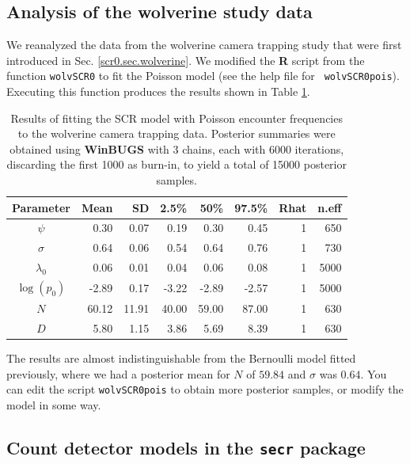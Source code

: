 

\subsection{Analysis of the wolverine study data}

We reanalyzed the data from the wolverine camera trapping study that
were first introduced in Sec. \ref{scr0.sec.wolverine}.  We modified
the {\bf R} script from the function \mbox{\tt wolvSCR0} to fit the
Poisson model (see the help file for \mbox{\tt
  wolvSCR0pois}). Executing this function produces the results shown
in Table \ref{poisson-mn.tab.wolverine}.
\begin{table}
\centering
\caption{Results of fitting the SCR model with Poisson encounter
  frequencies to the wolverine camera trapping data.
Posterior summaries were obtained using {\bf WinBUGS} with
 3 chains, each with 6000 iterations, discarding the first 1000 as
 burn-in, to yield a total of 15000 posterior samples.
}
\begin{tabular}{crrrrrrr} \hline \hline
 Parameter & Mean &  SD & 2.5\% & 50\%  & 97.5\% &Rhat& n.eff \\ \hline
$\psi$     &  0.30& 0.07& 0.19 &  0.30 & 0.45& 1 &  650 \\
$\sigma$   &  0.64& 0.06& 0.54 &  0.64 & 0.76& 1 &  730 \\
$\lambda_{0}$& 0.06& 0.01& 0.04 &  0.06 & 0.08& 1&  5000\\
$\log(p_0)$  &-2.89& 0.17& -3.22& -2.89& -2.57& 1&  5000\\
$N$        & 60.12&11.91& 40.00& 59.00& 87.00& 1&   630\\
$D$        &  5.80& 1.15& 3.86 & 5.69 & 8.39 & 1&   630\\ \hline
\end{tabular}
\label{poisson-mn.tab.wolverine}
\end{table}
The results are almost indistinguishable from the Bernoulli model
fitted previously, where we had a posterior mean for $N$ of
 $59.84$ and  $\sigma$ was $0.64$. 
You can 
edit the script \mbox{\tt wolvSCR0pois} to  obtain more posterior
 samples, or modify the model in some way.


\subsection{Count detector models in the  \mbox{\tt secr} package}

